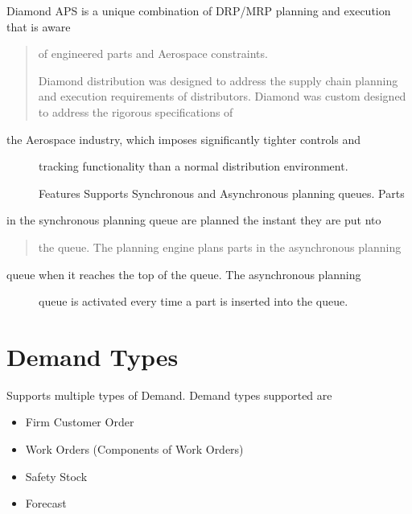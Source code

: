 \documentclass[letterpaper,10pt,english]{sphinxmanual}
\begin{document}
Diamond APS is a unique combination of DRP/MRP planning and execution
that is aware
\begin{quote}

of engineered parts and Aerospace constraints.

Diamond distribution was designed to address the
supply chain planning and execution requirements of distributors.
Diamond was custom designed to address the rigorous specifications of
\end{quote}
\begin{description}
\item[{the Aerospace industry, which imposes significantly tighter controls and}] \leavevmode
tracking functionality than a normal distribution environment.

Features Supports Synchronous and Asynchronous planning queues. Parts

\end{description}

in the synchronous planning queue are planned the instant they are put
nto
\begin{quote}

the queue. The planning engine plans parts in the asynchronous planning
\end{quote}
\begin{description}
\item[{queue when it reaches the top of the queue. The asynchronous planning}] \leavevmode
queue is activated every time a part is inserted into the queue.

\end{description}


\section{Demand Types}
\label{APS/APS-Features-and-Benefits:demand-types}
Supports multiple types of Demand. Demand types supported are
\begin{itemize}
\item {} 
Firm Customer Order

\item {} 
Work Orders (Components of Work Orders)

\item {} 
Safety Stock

\item {} 
Forecast

\end{itemize}
\end{document}
